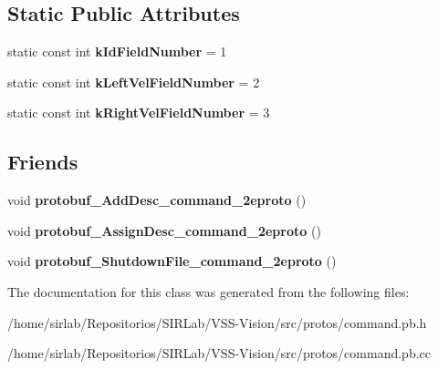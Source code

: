 \subsection*{Static Public Attributes}
\begin{DoxyCompactItemize}
\item 
\hypertarget{classvss__command_1_1Robot__Command_a72d358bc06840eb9b5835ad46cee4620}{static const int {\bfseries k\-Id\-Field\-Number} = 1}\label{classvss__command_1_1Robot__Command_a72d358bc06840eb9b5835ad46cee4620}

\item 
\hypertarget{classvss__command_1_1Robot__Command_a834467a27672508216892c745d78bad4}{static const int {\bfseries k\-Left\-Vel\-Field\-Number} = 2}\label{classvss__command_1_1Robot__Command_a834467a27672508216892c745d78bad4}

\item 
\hypertarget{classvss__command_1_1Robot__Command_adb4e9f137218f7bf68ba93029e028e40}{static const int {\bfseries k\-Right\-Vel\-Field\-Number} = 3}\label{classvss__command_1_1Robot__Command_adb4e9f137218f7bf68ba93029e028e40}

\end{DoxyCompactItemize}
\subsection*{Friends}
\begin{DoxyCompactItemize}
\item 
\hypertarget{classvss__command_1_1Robot__Command_a4825d92f856fcb4b02c67b601c433796}{void {\bfseries protobuf\-\_\-\-Add\-Desc\-\_\-command\-\_\-2eproto} ()}\label{classvss__command_1_1Robot__Command_a4825d92f856fcb4b02c67b601c433796}

\item 
\hypertarget{classvss__command_1_1Robot__Command_a4c6fb97c25079d49daf010087d869100}{void {\bfseries protobuf\-\_\-\-Assign\-Desc\-\_\-command\-\_\-2eproto} ()}\label{classvss__command_1_1Robot__Command_a4c6fb97c25079d49daf010087d869100}

\item 
\hypertarget{classvss__command_1_1Robot__Command_a4cf10633ad46690f5eec6bdbbcf62de0}{void {\bfseries protobuf\-\_\-\-Shutdown\-File\-\_\-command\-\_\-2eproto} ()}\label{classvss__command_1_1Robot__Command_a4cf10633ad46690f5eec6bdbbcf62de0}

\end{DoxyCompactItemize}


The documentation for this class was generated from the following files\-:\begin{DoxyCompactItemize}
\item 
/home/sirlab/\-Repositorios/\-S\-I\-R\-Lab/\-V\-S\-S-\/\-Vision/src/protos/command.\-pb.\-h\item 
/home/sirlab/\-Repositorios/\-S\-I\-R\-Lab/\-V\-S\-S-\/\-Vision/src/protos/command.\-pb.\-cc\end{DoxyCompactItemize}
